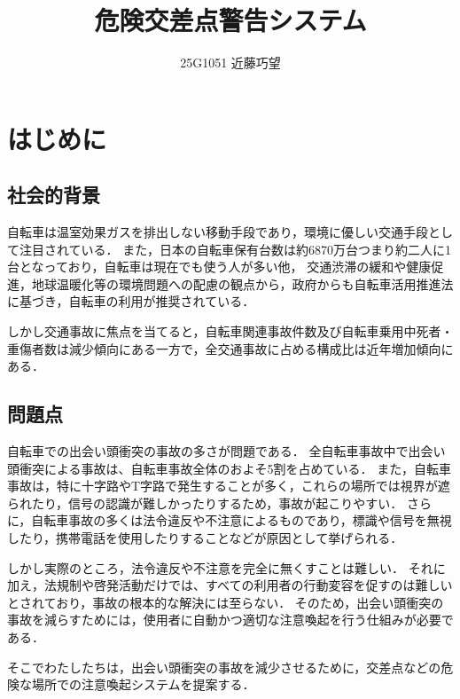 \documentclass[uplatex,dvipdfmx]{jsarticle}
\begin{document}
\title{危険交差点警告システム}
\author{25G1051 近藤巧望}
\maketitle
\section{はじめに}

\subsection{社会的背景}
\indent
自転車は温室効果ガスを排出しない移動手段であり，環境に優しい交通手段として注目されている．
また，日本の自転車保有台数は約6870万台つまり約二人に1台となっており，自転車は現在でも使う人が多い他，
交通渋滞の緩和や健康促進，地球温暖化等の環境問題への配慮の観点から，政府からも自転車活用推進法に基づき，自転車の利用が推奨されている．
\cite{ref:koutuusyou_1}
\cite{ref:koutuusyou_2}
\par
しかし交通事故に焦点を当てると，自転車関連事故件数及び自転車乗用中死者・重傷者数は減少傾向にある一方で，全交通事故に占める構成比は近年増加傾向にある．
\cite{ref:sonpo_1}
\par

\subsection{問題点}
\indent
自転車での出会い頭衝突の事故の多さが問題である．
全自転車事故中で出会い頭衝突による事故は、自転車事故全体のおよそ5割を占めている．
また，自転車事故は，特に十字路やT字路で発生することが多く，これらの場所では視界が遮られたり，信号の認識が難しかったりするため，事故が起こりやすい．
さらに，自転車事故の多くは法令違反や不注意によるものであり，標識や信号を無視したり，携帯電話を使用したりすることなどが原因として挙げられる．
\cite{ref:keisatu_1}
\par
しかし実際のところ，法令違反や不注意を完全に無くすことは難しい．
それに加え，法規制や啓発活動だけでは、すべての利用者の行動変容を促すのは難しいとされており，事故の根本的な解決には至らない．
そのため，出会い頭衝突の事故を減らすためには，使用者に自動かつ適切な注意喚起を行う仕組みが必要である．
\par
そこでわたしたちは，出会い頭衝突の事故を減少させるために，交差点などの危険な場所での注意喚起システムを提案する．
\par
\end{document}
